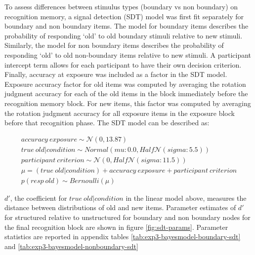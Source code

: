 To assess differences between stimulus types (boundary vs non boundary) on recognition memory, a signal detection (SDT) model was first fit separately for boundary and non boundary items. The model for boundary items describes the probability of responding `old' to old boundary stimuli relative to new stimuli. Similarly, the model for non boundary items describes the probability of responding `old' to old non-boundary items relative to new stimuli. A participant intercept term allows for each participant to have their own decision criterion. Finally, accuracy at exposure was included as a factor in the SDT model. Exposure accuracy factor for old items was computed by averaging the rotation judgment accuracy for each of the old items in the block immediately before the recognition memory block. For new items, this factor was computed by averaging the rotation judgment accuracy for all exposure items in the exposure block before that recognition phase. The SDT model can be described as: 

\begin{equation}
    \begin{aligned}
        accuracy\ exposure \sim \mathcal{N}(0, 13.87) \\
        true\ old | condition \sim Normal(mu: 0.0, Half\mathcal{N}(sigma: 5.5)) \\ 
        participant\ criterion \sim \mathcal{N}(0, Half\mathcal{N}(sigma: 11.5)) \\
        \mu = (true\ old | condition) + accuracy\ exposure + participant\ criterion \\ 
        p(resp\ old) \sim Bernoulli(\mu)        
    \end{aligned}
\end{equation}




$d'$, the coefficient for $true\ old | condition$ in the linear model above, measures the distance between distributions of old and new items. Parameter estimates of $d'$ for structured relative to unstructured for boundary and non boundary nodes for the final recognition block are shown in figure \ref{fig:sdt-params}. Parameter statistics are reported in appendix tables \ref{tab:exp3-bayesmodel-boundary-sdt} and \ref{tab:exp3-bayesmodel-nonboundary-sdt}

